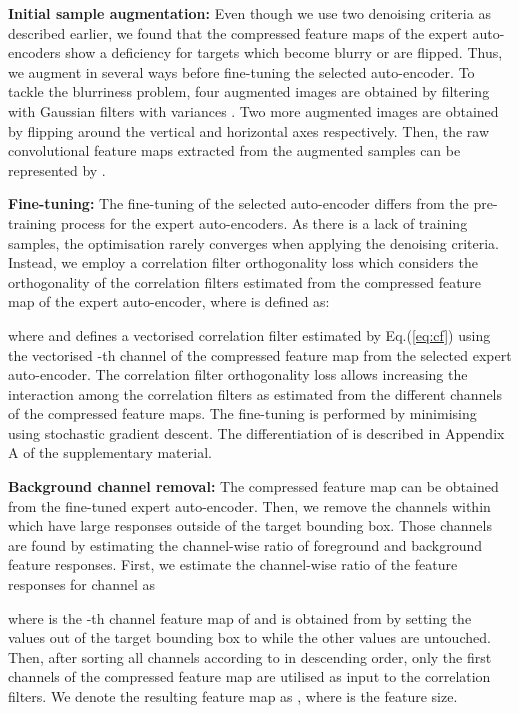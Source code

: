 \documentclass[10pt,twocolumn,letterpaper]{article}
\begin{document}
\textbf{Initial sample augmentation: }
Even though we use two denoising criteria as described earlier, we found that the compressed feature maps of the expert auto-encoders show a deficiency for targets which become blurry or are flipped. 
Thus, we augment  in several ways before fine-tuning the selected auto-encoder. 
To tackle the blurriness problem, four augmented images are obtained by filtering  with Gaussian filters with variances . Two more augmented images are obtained by flipping  around the vertical and horizontal axes respectively.
Then, the raw convolutional feature maps extracted from the augmented samples can be represented by .


\textbf{Fine-tuning: }
The fine-tuning of the selected auto-encoder differs from the pre-training process for the expert auto-encoders.
As there is a lack of training samples, the optimisation rarely converges when applying the denoising criteria.
Instead, we employ a correlation filter orthogonality loss  which considers the orthogonality of the correlation filters estimated from the compressed feature map of the expert auto-encoder, where  is defined as:
\vspace{-2mm}

\normalsize
where  and  defines a vectorised correlation filter estimated by Eq.(\ref{eq:cf}) using the vectorised -th channel of the compressed feature map  from the selected expert auto-encoder. 
The correlation filter orthogonality loss allows increasing the interaction among the correlation filters as estimated from the different channels of the compressed feature maps. 
The fine-tuning is performed by minimising  using stochastic gradient descent.
The differentiation of  is described in Appendix A of the supplementary material.

\textbf{Background channel removal: } 
The compressed feature map  can be obtained from the fine-tuned expert auto-encoder.
Then, we remove the channels within  which have large responses outside of the target bounding box.
Those channels are found by estimating the channel-wise ratio of foreground and background feature responses.
First, we estimate the channel-wise ratio of the feature responses for channel  as 

where  is the -th channel feature map of  and  is obtained from  by setting the values out of the target bounding box to  while the other values are untouched. Then, after sorting all channels according to  in descending order, only the first  channels of the compressed feature map are utilised as input to the correlation filters. We denote the resulting feature map as , where  is the feature size.
\end{document}
